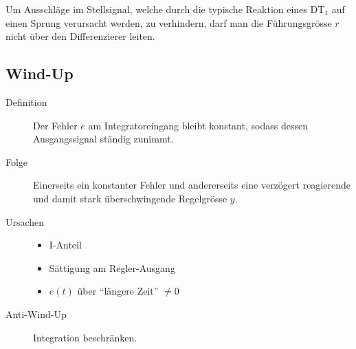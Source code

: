 Um Ausschläge im Stellsignal, welche durch die typische Reaktion eines DT\(_1\) auf einen Sprung verursacht werden, zu verhindern, darf man die Führungsgrösse \(r\) nicht über den Differenzierer leiten.


\subsection{Wind-Up }
\begin{description}
	\item[Definition] Der Fehler \(e\) am Integratoreingang bleibt konstant, sodass dessen Ausgangssignal ständig zunimmt.
	\item[Folge] Einerseits ein konstanter Fehler und andererseits eine verzögert reagierende und damit stark überschwingende Regelgrösse \(y\).

	\item[Ursachen]
		\begin{itemize}
			\item I-Anteil
			\item Sättigung am Regler-Ausgang
			\item \(e(t)\) über ``längere Zeit'' $\neq 0$
		\end{itemize}

	\item[Anti-Wind-Up] Integration beschränken.
\end{description}
